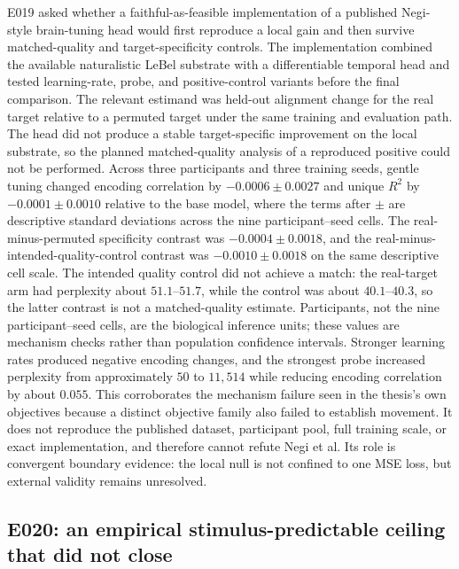 E019 asked whether a faithful-as-feasible implementation of a published Negi-style brain-tuning head would first reproduce a local gain and then survive matched-quality and target-specificity controls.
The implementation combined the available naturalistic LeBel substrate with a differentiable temporal head and tested learning-rate, probe, and positive-control variants before the final comparison.
The relevant estimand was held-out alignment change for the real target relative to a permuted target under the same training and evaluation path.
The head did not produce a stable target-specific improvement on the local substrate, so the planned matched-quality analysis of a reproduced positive could not be performed. 
Across three participants and three training seeds, gentle tuning changed encoding correlation by $-0.0006\pm0.0027$ and unique $R^2$ by $-0.0001\pm0.0010$ relative to the base model, where the terms after $\pm$ are descriptive standard deviations across the nine participant--seed cells. 
The real-minus-permuted specificity contrast was $-0.0004\pm0.0018$, and the real-minus-intended-quality-control contrast was $-0.0010\pm0.0018$ on the same descriptive cell scale. 
The intended quality control did not achieve a match: the real-target arm had perplexity about $51.1$--$51.7$, while the control was about $40.1$--$40.3$, so the latter contrast is not a matched-quality estimate. 
Participants, not the nine participant--seed cells, are the biological inference units; these values are mechanism checks rather than population confidence intervals.
Stronger learning rates produced negative encoding changes, and the strongest probe increased perplexity from approximately $50$ to $11{,}514$ while reducing encoding correlation by about $0.055$. 
This corroborates the mechanism failure seen in the thesis's own objectives because a distinct objective family also failed to establish movement.
It does not reproduce the published dataset, participant pool, full training scale, or exact implementation, and therefore cannot refute Negi et al.
Its role is convergent boundary evidence: the local null is not confined to one MSE loss, but external validity remains unresolved.

\subsection{E020: an empirical stimulus-predictable ceiling that did not close}
\label{sec:e020}

